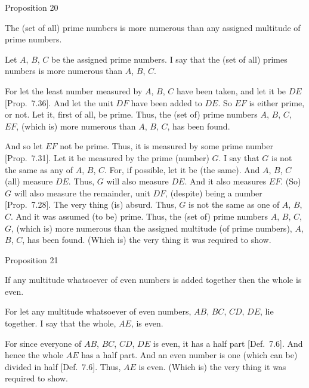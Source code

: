 \begin{center}
{\large Proposition 20}
\end{center}

The (set of all) prime numbers is more numerous than any assigned
multitude of prime numbers.

\epsfysize=1.3in
\centerline{}

Let $A$, $B$, $C$ be the assigned prime numbers. I say that the (set of all)
primes numbers is more numerous than $A$, $B$, $C$.

For let the least number measured by  $A$, $B$, $C$ have been taken, and let it be $DE$ [Prop.~7.36]. And let the unit $DF$ have been added to $DE$. So $EF$ is either prime, or not. Let it, first of all,
be prime. Thus, the (set of) prime numbers $A$, $B$, $C$, $EF$, (which is) more numerous than $A$, $B$, $C$, has been found.

And so let $EF$ not be prime. Thus, it is measured by some prime number [Prop.~7.31]. Let it be measured by the prime
(number) $G$. I say that $G$ is not the same as any of $A$, $B$, $C$. 
For, if possible, let it be (the same). And $A$, $B$, $C$ (all) measure
$DE$. Thus, $G$ will also measure $DE$. And it also measures $EF$. (So)
$G$ will also measure the remainder, unit $DF$, (despite) being a number
[Prop.~7.28]. The very thing (is) absurd. Thus, $G$
is not the same as one of $A$, $B$, $C$. And it was assumed (to be) prime.
Thus, the (set of) prime numbers $A$, $B$, $C$, $G$, (which is) more numerous than the assigned multitude (of prime numbers), $A$, $B$, $C$, has been found. (Which is) the very thing it
was required to show.


\begin{center}
{\large Proposition 21}
\end{center}

If any multitude whatsoever of even numbers
is added together then the whole is even.

\epsfysize=0.3in
\centerline{}

For let any multitude  whatsoever of even numbers, $AB$, $BC$, $CD$, $DE$, lie together. I say that the whole, $AE$, is even.

For since everyone  of $AB$, $BC$, $CD$, $DE$ is even, it has a half part
[Def.~7.6]. And hence the whole $AE$ has
a half part. And an even number is one (which can be) divided in half [Def.~7.6]. Thus, $AE$ is even. (Which is) the very thing it was required to show.

